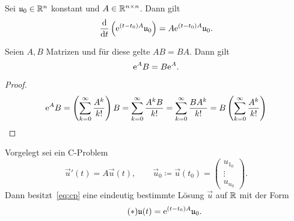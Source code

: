 \begin{corollary}\label{thm:matrixexp-derivative-corollary}
    Sei $\mathfrak{u}_0 \in \mathbb{R}^n$ konstant und $A \in \mathbb{R}^{n \times n}$.
    Dann gilt
    \begin{equation*}
        \frac{\mathrm{d} }{\mathrm{d} t} \left( \mathrm{e}^{(t - t_0) A} \mathfrak{u}_0 \right) = A \mathrm{e}^{(t - t_0) A} \mathfrak{u}_0.
    \end{equation*}
\end{corollary}

\begin{lemma}\label{thm:matrixexp-commute}
    Seien $A,B$ Matrizen und für diese gelte $AB = BA$.
    Dann gilt
    \begin{equation*}
        \mathrm{e}^A B = B \mathrm{e}^A.
    \end{equation*}
\end{lemma}

\begin{proof}
    \begin{equation*}
        \mathrm{e}^A B = \left( \sum^\infty_{k=0} \frac{A^k}{k!} \right) B
        = \sum^\infty_{k=0} \frac{A^k B}{k!}
        = \sum^\infty_{k=0} \frac{B A^k}{k!}
        = B \left( \sum^\infty_{k=0} \frac{A^k}{k!} \right)
    \end{equation*}
\end{proof}

\begin{theorem}\label{thm:existenz-eindeutigkeit}
    Vorgelegt sei ein C-Problem
    \begin{equation}\tag{CP}\label{eq:cp}
        \vec{u}'(t) = A \vec{u}(t), \qquad \vec{u}_0 \coloneqq \vec{u}(t_0) = \begin{pmatrix} u_{1_0}\\ \vdots\\ u_{n_0} \end{pmatrix}.
    \end{equation}
    Dann besitzt~\eqref{eq:cp} eine eindeutig bestimmte Lösung $\vec{u}$ auf $\mathbb{R}$ mit der Form
    \begin{equation}\tag{$\ast$}\label{eq:solution}
        \mathfrak{u}(t) = \mathrm{e}^{(t - t_0) A} \mathfrak{u}_0.
    \end{equation}
\end{theorem}

